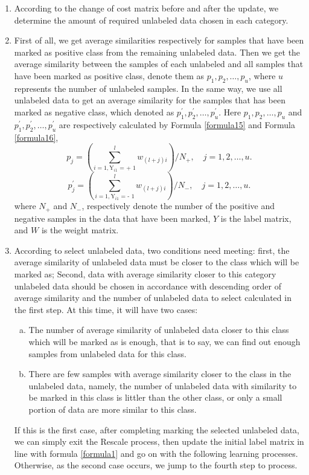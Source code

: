 \documentclass{svjour3}                     %
\begin{document}
\begin{enumerate}[1)]
  \item According to the change of cost matrix before and after the update, we determine the amount of required unlabeled data chosen in each category.
  \item First of all, we get average similarities respectively for samples that have been marked as positive class from the remaining unlabeled data. Then we get the average similarity between the samples of each unlabeled and all samples that have been marked as positive class, denote them as ${p_1},{p_2},\ldots ,{p_u}$, where $u$ represents the number of unlabeled samples. In the same way,  we use all unlabeled data to get an average similarity for the samples that has been marked as negative class, which denoted as $p_1^\prime ,p_2^\prime , \ldots ,p_u^\prime $. Here ${p_1},{p_2},\ldots ,{p_u}$ and $p_1^\prime ,p_2^\prime , \ldots ,p_u^\prime $ are respectively calculated by Formula \ref{formula15} and Formula \ref{formula16},
  \begin{equation} \label{formula15}
    {p_j} = (\mathop \sum \limits_{i = 1,{{\text{Y}}_{i1}}{\text{ =   + }}1}^l {w_{\left( {l + j} \right)i}})/{N_ + },\quad j = 1,2,\ldots,u.
  \end{equation}
  \begin{equation} \label{formula16}
  p_j^\prime  = (\mathop \sum \limits_{i = 1,{{\text{Y}}_{i1}}{\text{ =   - }}1}^l {w_{\left( {l + j} \right)i}})/{N_ - },\quad j = 1,2,\ldots,u.
  \end{equation}
  where $N_+$ and $N_-$, respectively denote the number of the positive and negative samples in the data that have been marked, $Y$ is the label matrix, and $W$ is the weight matrix.
  \item According to select unlabeled data, two conditions need meeting: first, the average similarity
of unlabeled data must be closer to the class which will be marked as; Second, data with average similarity closer to this category unlabeled data should be chosen in accordance with descending order of average similarity and the number of unlabeled data to select calculated in the first step. At this time, it will have two cases:
\begin{enumerate}[a)]
 \item The number of average similarity of unlabeled data closer to this class which will be marked as is enough, that is to say, we can find out enough samples from unlabeled data for this class.
 \item There are few samples with average similarity closer to the class in the unlabeled data, namely, the number of unlabeled data with similarity to be marked in this class is  littler than the other class, or only a small portion of data are more similar to this class.
\end{enumerate}
If this is the first case, after completing marking the selected unlabeled data, we can simply exit the Rescale process, then update the initial label matrix in line with formula \ref{formula1} and go on with the following learning processes. Otherwise, as the second case occurs, we jump to the fourth step to process. \label{step3}


\end{enumerate}
\end{document}
